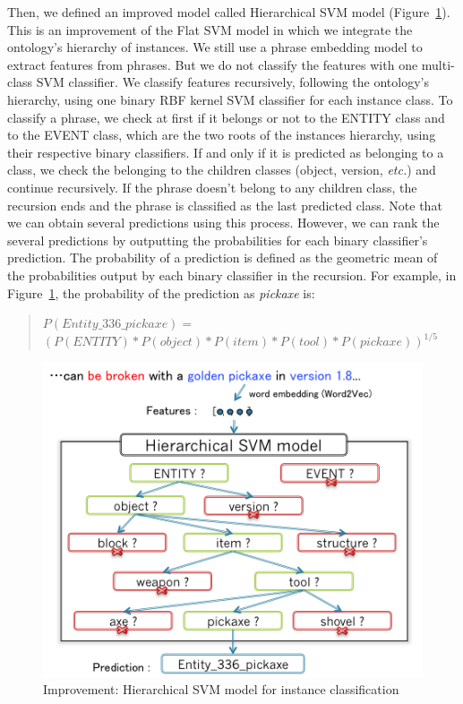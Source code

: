 \documentclass[12pt]{article}
\begin{document}
Then, we defined an improved model called Hierarchical SVM model (Figure~\ref{hierarchicalSVMModel}). This is an improvement of the Flat SVM model in which we integrate the ontology's hierarchy of instances. We still use a phrase embedding model to extract features from phrases. But we do not classify the features with one multi-class SVM classifier. We classify features recursively, following the ontology's hierarchy, using one binary RBF kernel SVM classifier for each instance class. To classify a phrase, we check at first if it belongs or not to the ENTITY class and to the EVENT class, which are the two roots of the instances hierarchy, using their respective binary classifiers. If and only if it is predicted as belonging to a class, we check the belonging to the children classes (object, version, \emph{etc.}) and continue recursively. If the phrase doesn't belong to any children class, the recursion ends and the phrase is classified as the last predicted class. Note that we can obtain several predictions using this process. However, we can rank the several predictions by outputting the probabilities for each binary classifier's prediction. The probability of a prediction is defined as the geometric mean of the probabilities output by each binary classifier in the recursion. For example, in Figure~\ref{hierarchicalSVMModel}, the probability of the prediction as \textit{pickaxe} is:
\begin{quote}
$P(Entity\_336\_pickaxe) =$\\
$	(P(ENTITY)*P(object)*P(item)*P(tool)*P(pickaxe))^{1/5}$
\end{quote}

\begin{figure}[!ht]
   \centering \includegraphics[width=0.7\linewidth]{Figures/Semantic_Parsing/hierarchicalSVMModel.png}
   \caption{\label{hierarchicalSVMModel} Improvement: Hierarchical SVM model for instance classification}
\end{figure}
\end{document}
